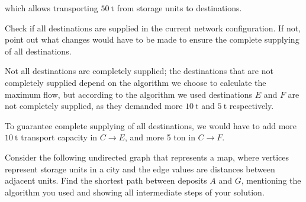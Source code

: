 {which allows transporting $\SI{50}{\tonne}$ from storage units to destinations.

Check if all destinations are supplied in the current network configuration. If not, point out what changes would have to be made to ensure the complete supplying of all destinations.

\ansseparator

Not all destinations are completely supplied; the destinations that are not completely supplied depend on the algorithm we choose to calculate the maximum flow, but according to the algorithm we used destinations $E$ and $F$ are not completely supplied, as they demanded more $\SI{10}{\tonne}$ and $\SI{5}{\tonne}$ respectively. 

To guarantee complete supplying of all destinations, we would have to add more $\SI{10}{\tonne}$ transport capacity in $C \rightarrow E$, and more 5 ton in $C \rightarrow F$.

Consider the following undirected graph that represents a map, where vertices represent storage units in a city and the edge values are distances between adjacent units. Find the shortest path between deposits $A$ and $G$, mentioning the algorithm you used and showing all intermediate steps of your solution.

\begin{center}
\end{center}

}
